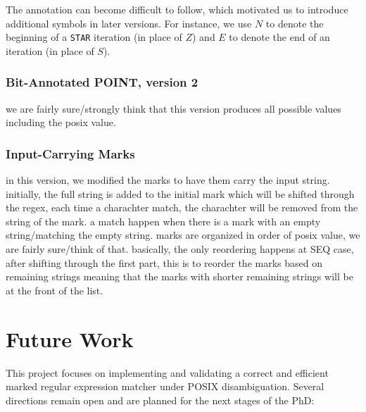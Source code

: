 \documentclass[12pt]{article}
\begin{document}
The annotation can become difficult to follow, which motivated us to introduce additional symbols 
  in later versions. For instance, we use \(N\) to denote the beginning of a \texttt{STAR} iteration
  (in place of \(Z\)) and \(E\) to denote the end of an iteration (in place of \(S\)).


\subsubsection{Bit-Annotated POINT, version 2}
we are fairly sure/strongly think that this version produces all possible values including the posix value.
\subsubsection{Input-Carrying Marks}
in this version, we modified the marks to have them carry the input string. initially, the full string is added to
the initial mark which will be shifted through the regex, each time a charachter match, the charachter will be removed
from the string of the mark. a match happen when there is a mark with an empty string/matching the empty string.
marks are organized in order of posix value, we are fairly sure/think of that. basically, the only reordering happens at
SEQ case, after shifting through the first part, this is to reorder the marks based on remaining strings meaning that
the marks with shorter remaining strings will be at the front of the list.

\section{Future Work}
This project focuses on implementing and validating a correct and efficient marked regular expression matcher under POSIX disambiguation. Several directions remain open and are planned for the next stages of the PhD:
\end{document}
